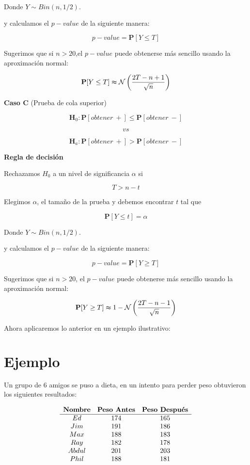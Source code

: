\documentclass[
  a4paper,
  oneside,
  openany]{book}
\begin{document}
Donde \(Y \sim Bin (n,1/2)\).

y calculamos el \(p-value\) de la siguiente manera:

\[p-value=\mathbf{P}[Y\leq T]\]

Sugerimos que si \(n > 20\),el \(p-value\) puede obtenerse más sencillo usando la aproximación normal:

\[\mathbf{P}[Y\leq T] \thickapprox  \mathcal{N} \left(\frac{2T-n+1}{\sqrt{n}}\right)\]

\textbf{Caso C} (Prueba de cola superior)

\[\textbf{H}_0: \mathbf{P}[obtener\ +] \leq \mathbf{P}[obtener\ -]\]

\[vs\]

\[\textbf{H}_a: \mathbf{P}[obtener\ +] > \mathbf{P}[obtener\ -]\]

\textbf{Regla de decisión}

Rechazamos \(H_0\) a un nivel de significancia \(\alpha\) si

\[T > n-t\]

Elegimos \(\alpha\), el tamaño de la prueba y debemos encontrar \(t\) tal que

\[\mathbf{P}[Y \leq t]=\alpha\]

Donde \(Y \sim Bin (n,1/2)\).

y calculamos el \(p-value\) de la siguiente manera:

\[p-value=\mathbf{P}[Y\geq T]\]

Sugerimos que si \(n > 20\), el \(p-value\) puede obtenerse más sencillo usando la aproximación normal:

\[\mathbf{P}[Y\geq T] \thickapprox 1- \mathcal{N} \left(\frac{2T-n-1}{\sqrt{n}}\right)\]

Ahora aplicaremos lo anterior en un ejemplo ilustrativo:

\hypertarget{ejemplo-2}{%
\section{Ejemplo}\label{ejemplo-2}}

Un grupo de 6 amigos se puso a dieta, en un intento para perder peso obtuvieron los siguientes resultados:

\[
\begin{array}{c c c c } 
\textbf{Nombre} & \textbf{Peso Antes} & \textbf{Peso Después} \\
\hline
Ed    & 174 & 165 \\
Jim   & 191 & 186 \\
Max   & 188 & 183 \\
Ray   & 182 & 178 \\
Abdul & 201 & 203 \\
Phil  & 188 & 181 \\
\end{array} 
\]
\end{document}
